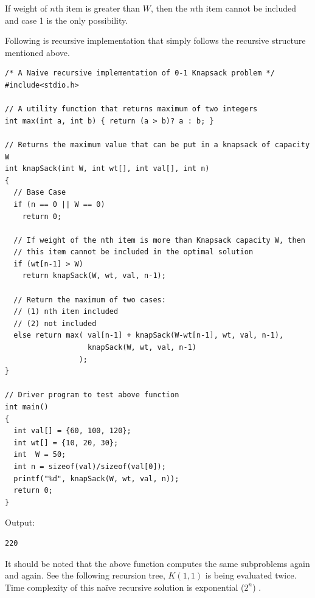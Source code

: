 If weight of $n$th item is greater than $W$, then the $n$th item cannot be
included and case 1 is the only possibility.


Following is recursive implementation that simply follows the recursive
structure mentioned above.
\begin{lstlisting}[style=raycppnewsnippet]
/* A Naive recursive implementation of 0-1 Knapsack problem */
#include<stdio.h>
 
// A utility function that returns maximum of two integers
int max(int a, int b) { return (a > b)? a : b; }
 
// Returns the maximum value that can be put in a knapsack of capacity W
int knapSack(int W, int wt[], int val[], int n)
{
  // Base Case
  if (n == 0 || W == 0)
    return 0;
 
  // If weight of the nth item is more than Knapsack capacity W, then
  // this item cannot be included in the optimal solution
  if (wt[n-1] > W)
    return knapSack(W, wt, val, n-1);
 
  // Return the maximum of two cases: 
  // (1) nth item included 
  // (2) not included
  else return max( val[n-1] + knapSack(W-wt[n-1], wt, val, n-1),
                   knapSack(W, wt, val, n-1)
                 );
}
 
// Driver program to test above function
int main()
{
  int val[] = {60, 100, 120};
  int wt[] = {10, 20, 30};
  int  W = 50;
  int n = sizeof(val)/sizeof(val[0]);
  printf("%d", knapSack(W, wt, val, n));
  return 0;
}
\end{lstlisting}
Output:
\begin{lstlisting}[style=rayio]
220
\end{lstlisting}
It should be noted that the above function computes the same subproblems
again and again. See the following recursion tree, $K(1,1)$ is being
evaluated twice. Time complexity of this na\"ive recursive solution is
exponential ($2^n$) .

